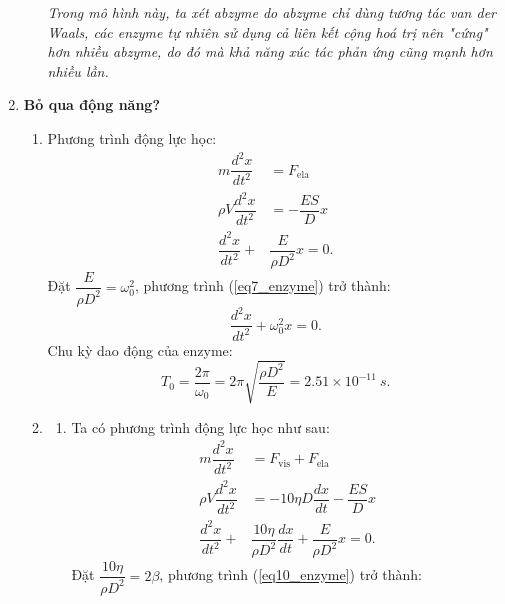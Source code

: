 \begin{enumerate}
\begin{enumerate}[label=\textbf{\alph*,}]
    \textit{Trong mô hình này, ta xét abzyme do abzyme chỉ dùng tương tác van der Waals, các enzyme tự nhiên sử dụng cả liên kết cộng hoá trị nên "cứng" hơn nhiều abzyme, do đó mà khả năng xúc tác phản ứng cũng mạnh hơn nhiều lần.}
    \end{enumerate}
    \item \textbf{Bỏ qua động năng?}\\
    \begin{enumerate}[label=\textbf{\alph*,}]\itemsep0em
        \item Phương trình động lực học:
        \begin{equation} \label{eq7_enzyme}
        \begin{split}
            m\dfrac{d^2 x}{dt^2}&=F_{\text{ela}}\\
            \rho V \dfrac{d^2 x}{dt^2}&= - \dfrac{ES}{D}x \\
            \dfrac{d^2 x}{dt^2}+&\dfrac{E}{\rho D^2}x=0.    
        \end{split}
        \end{equation}
        Đặt $\dfrac{E}{\rho D^2}=\omega_0^2$, phương trình (\ref{eq7_enzyme}) trở thành:
        \begin{equation} \label{eq8_enzyme}
            \dfrac{d^2 x}{dt^2}+\omega_0^2 x=0.
        \end{equation}
        Chu kỳ dao động của enzyme:
        \begin{equation} \label{eq9_enzyme}
            T_0=\dfrac{2\pi}{\omega_0}=2\pi \sqrt{\dfrac{\rho D^2}{E}}=2.51 \times 10^{-11} \ \si{s}.
        \end{equation}
        \item 
        \begin{enumerate}
            \item Ta có phương trình động lực học như sau:
        \begin{equation} \label{eq10_enzyme}
        \begin{split}
            m\dfrac{d^2 x}{dt^2} &=F_{\text{vis}}+F_{\text{ela}}\\
            \rho V \dfrac{d^2 x}{dt^2} &=-10 \eta D \dfrac{dx}{dt} - \dfrac{ES}{D}x \\
            \dfrac{d^2 x}{dt^2}+ &\dfrac{10\eta }{\rho D^2}\dfrac{dx}{dt}+\dfrac{E}{\rho D^2}x=0.
        \end{split}
        \end{equation}
        Đặt $\dfrac{10\eta }{\rho D^2}=2\beta$, phương trình (\ref{eq10_enzyme}) trở thành:
        \begin{equation} \label{eq11_enzyme}

\end{equation}
\end{enumerate}
\end{enumerate}
\end{enumerate}
